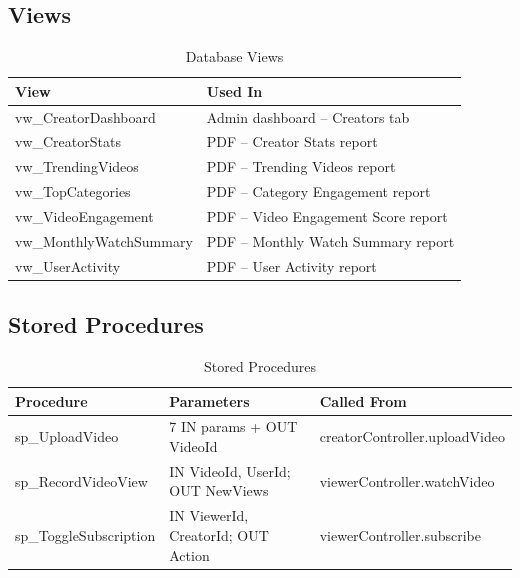 \documentclass[a4paper, twoside]{article}
\begin{document}
\subsection{Views}

\begin{table}[H]
\centering
\caption{Database Views}
\label{tab:DBViews}
\begin{tabular}{|l|l|}
\hline
\textbf{View}               & \textbf{Used In}                              \\ \hline
vw\_CreatorDashboard        & Admin dashboard -- Creators tab               \\ \hline
vw\_CreatorStats            & PDF -- Creator Stats report                   \\ \hline
vw\_TrendingVideos          & PDF -- Trending Videos report                 \\ \hline
vw\_TopCategories           & PDF -- Category Engagement report             \\ \hline
vw\_VideoEngagement         & PDF -- Video Engagement Score report          \\ \hline
vw\_MonthlyWatchSummary     & PDF -- Monthly Watch Summary report           \\ \hline
vw\_UserActivity            & PDF -- User Activity report                   \\ \hline
\end{tabular}
\end{table}

\subsection{Stored Procedures}

\begin{table}[H]
\centering
\caption{Stored Procedures}
\label{tab:DBProcs}
\begin{tabular}{|l|l|l|}
\hline
\textbf{Procedure}          & \textbf{Parameters}                            & \textbf{Called From}                  \\ \hline
sp\_UploadVideo             & 7 IN params + OUT VideoId                      & creatorController.uploadVideo         \\ \hline
sp\_RecordVideoView         & IN VideoId, UserId; OUT NewViews               & viewerController.watchVideo           \\ \hline
sp\_ToggleSubscription      & IN ViewerId, CreatorId; OUT Action             & viewerController.subscribe            \\ \hline
\end{tabular}
\end{table}
\end{document}
